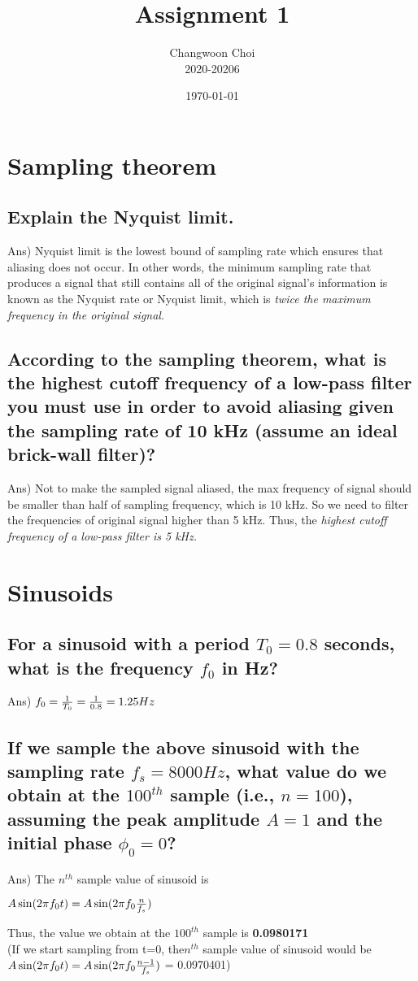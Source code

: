 \documentclass[12pt]{article}%
\begin{document}
\title{Assignment 1}
\author{Changwoon Choi \\ 2020-20206}
\date{\today}
\maketitle

\section{Sampling theorem}
\subsection{Explain the Nyquist limit.}
Ans) Nyquist limit is the lowest bound of sampling rate which ensures that aliasing does not occur. In other words, the minimum sampling rate that produces a signal that still contains all of the original signal's information is known as the Nyquist rate or Nyquist limit, which is \textit{twice the maximum frequency in the original signal}.

\subsection{According to the sampling theorem, what is the highest cutoff frequency of a low-pass filter you must use in order to avoid aliasing given the sampling rate of 10 kHz (assume an ideal brick-wall filter)?}
Ans) Not to make the sampled signal aliased, the max frequency of signal should be smaller than half of sampling frequency, which is 10 kHz. So we need to filter the frequencies of original signal higher than 5 kHz. Thus, the \textit{highest cutoff frequency of a low-pass filter is 5 kHz.}

\section{Sinusoids}

\subsection{For a sinusoid with a period $T_0 = 0.8$  seconds, what is the frequency $f_0$ in Hz?}
Ans) 
$f_0 = {1 \over T_0} = {1 \over 0.8} = 1.25Hz$

\subsection{If we sample the above sinusoid with the sampling rate $f_s=8000 Hz$, what value do we obtain at the $100^{th}$  sample (i.e., $n=100$), assuming the peak amplitude $A=1$  and the initial phase $\phi_0 = 0$?}
Ans) The $n^{th}$ sample value of sinusoid is 
\begin{center}
	$A \sin(2 \pi f_0 t) = A \sin(2 \pi f_0 {n \over f_s})$
\end{center}
Thus, the value we obtain at the $100^{th}$ sample is \textbf{0.0980171} \\
(If we start sampling from t=0, the$n^{th}$ sample value of sinusoid would be $A \sin(2 \pi f_0 t) = A \sin(2 \pi f_0 {n-1 \over f_s})$ = 0.0970401)
\end{document}
